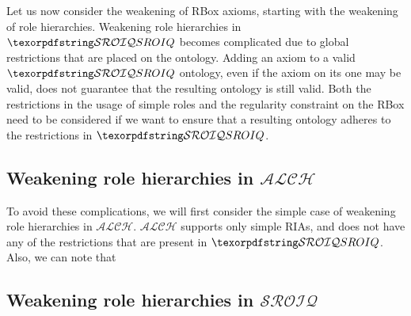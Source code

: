 Let us now consider the weakening of RBox axioms, starting with the weakening of role hierarchies. Weakening role hierarchies in $\SROIQ$ becomes complicated due to global restrictions that are placed on the ontology. Adding an axiom to a valid $\SROIQ$ ontology, even if the axiom on its one may be valid, does not guarantee that the resulting ontology is still valid. Both the restrictions in the usage of simple roles and the regularity constraint on the RBox need to be considered if we want to ensure that a resulting ontology adheres to the restrictions in $\SROIQ$.

\subsection{Weakening role hierarchies in $\mathcal{ALCH}$} \label{weakening-rbox-alch}

To avoid these complications, we will first consider the simple case of weakening role hierarchies in $\mathcal{ALCH}$. $\mathcal{ALCH}$ supports only simple RIAs, and does not have any of the restrictions that are present in $\SROIQ$. Also, we can note that

\begin{example}
\end{example}

\subsection{Weakening role hierarchies in $\mathcal{SROIQ}$} \label{weakening-rbox-SROIQ}

\begin{example}
\end{example}

\begin{example}
\end{example}

\begin{example}
\end{example}

